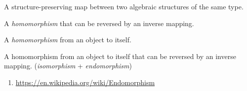 





\begin{multicols}{3}
  A structure-preserving map between two algebraic structures of the same type.

  A \textit{homomorphism} that can be reversed by an inverse mapping.

  A \textit{homomorphism} from an object to itself.

  A homomorphism from an object to itself that can be reversed by an inverse mapping.
  (\textit{isomorphism} + \textit{endomorphism})

\end{multicols}


\begin{enumerate}
\item \url{https://en.wikipedia.org/wiki/Endomorphism}
\end{enumerate}


